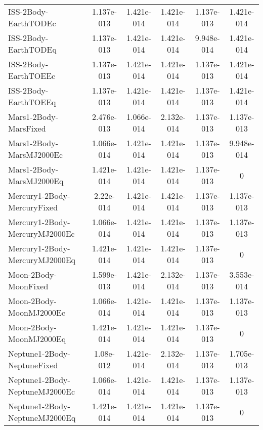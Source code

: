 \begin{table}[htbp!]
\begin{tabular}{lccccc}
         ISS-2Body-EarthTODEc & 1.137e-013 & 1.421e-014 & 1.421e-014 & 1.137e-013 & 1.421e-014 \\
         ISS-2Body-EarthTODEq & 1.137e-013 & 1.421e-014 & 1.421e-014 & 9.948e-014 & 1.421e-014 \\
         ISS-2Body-EarthTOEEc & 1.137e-013 & 1.421e-014 & 1.421e-014 & 1.137e-013 & 1.421e-014 \\
         ISS-2Body-EarthTOEEq & 1.137e-013 & 1.421e-014 & 1.421e-014 & 1.137e-013 & 1.421e-014 \\
         Mars1-2Body-MarsFixed & 2.476e-013 & 1.066e-014 & 2.132e-014 & 1.137e-013 & 1.137e-013 \\
         Mars1-2Body-MarsMJ2000Ec & 1.066e-014 & 1.421e-014 & 1.421e-014 & 1.137e-013 & 9.948e-014 \\
         Mars1-2Body-MarsMJ2000Eq & 1.421e-014 & 1.421e-014 & 1.421e-014 & 1.137e-013 & 0 \\
         Mercury1-2Body-MercuryFixed & 2.22e-014 & 1.421e-014 & 1.421e-014 & 1.137e-013 & 1.137e-013 \\
         Mercury1-2Body-MercuryMJ2000Ec & 1.066e-014 & 1.421e-014 & 1.421e-014 & 1.137e-013 & 1.137e-013 \\
         Mercury1-2Body-MercuryMJ2000Eq & 1.421e-014 & 1.421e-014 & 1.421e-014 & 1.137e-013 & 0 \\
         Moon-2Body-MoonFixed & 1.599e-013 & 1.421e-014 & 2.132e-014 & 1.137e-013 & 3.553e-014 \\
         Moon-2Body-MoonMJ2000Ec & 1.066e-014 & 1.421e-014 & 1.421e-014 & 1.137e-013 & 1.137e-013 \\
         Moon-2Body-MoonMJ2000Eq & 1.421e-014 & 1.421e-014 & 1.421e-014 & 1.137e-013 & 0 \\
         Neptune1-2Body-NeptuneFixed & 1.08e-012 & 1.421e-014 & 2.132e-014 & 1.137e-013 & 1.705e-013 \\
         Neptune1-2Body-NeptuneMJ2000Ec & 1.066e-014 & 1.421e-014 & 1.421e-014 & 1.137e-013 & 1.137e-013 \\
         Neptune1-2Body-NeptuneMJ2000Eq & 1.421e-014 & 1.421e-014 & 1.421e-014 & 1.137e-013 & 0 \\

\end{tabular}
\end{table}
